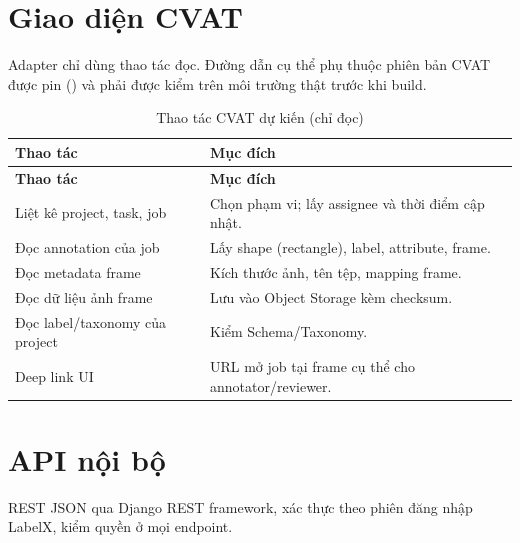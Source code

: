 \section{Giao diện CVAT}
\label{sec:cvatapi}
Adapter chỉ dùng thao tác đọc. Đường dẫn cụ thể phụ thuộc phiên bản CVAT được pin
(\TBD[-01]) và phải được kiểm trên môi trường thật trước khi build.

\begin{xltabular}{\linewidth}{@{}L{4.8cm}Y@{}}
\caption{Thao tác CVAT dự kiến (chỉ đọc)}\label{tab:cvatapi}\\
\toprule
\textbf{Thao tác} & \textbf{Mục đích}\\
\midrule
\endfirsthead
\toprule \textbf{Thao tác} & \textbf{Mục đích}\\ \midrule
\endhead
\bottomrule
\endfoot
Liệt kê project, task, job & Chọn phạm vi; lấy assignee và thời điểm cập nhật.\\
Đọc annotation của job & Lấy shape (rectangle), label, attribute, frame.\\
Đọc metadata frame & Kích thước ảnh, tên tệp, mapping frame.\\
Đọc dữ liệu ảnh frame & Lưu vào Object Storage kèm checksum.\\
Đọc label/taxonomy của project & Kiểm Schema/Taxonomy.\\
Deep link UI & URL mở job tại frame cụ thể cho annotator/reviewer.\\
\end{xltabular}

\section{API nội bộ}
\label{sec:api}
REST JSON qua Django REST framework, xác thực theo phiên đăng nhập LabelX, kiểm
quyền ở mọi endpoint.

